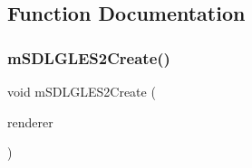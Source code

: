 \subsection{Function Documentation}
\mbox{\label{gles2-sdl_8c_a1940d2984f689899b148f24b7ab39e48}} 
\subsubsection{\texorpdfstring{m\+S\+D\+L\+G\+L\+E\+S2\+Create()}{mSDLGLES2Create()}}
{\footnotesize\ttfamily void m\+S\+D\+L\+G\+L\+E\+S2\+Create (\begin{DoxyParamCaption}\item[{struct \mbox{\hyperlink{structm_s_d_l_renderer}{m\+S\+D\+L\+Renderer}} $\ast$}]{renderer }\end{DoxyParamCaption})}

